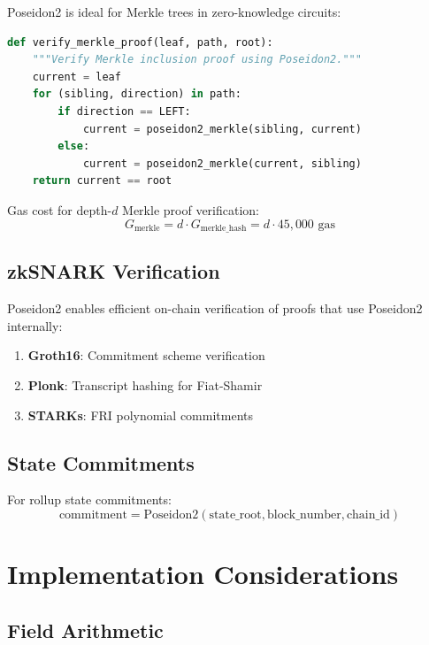 \documentclass[11pt,a4paper]{article}
\begin{document}
Poseidon2 is ideal for Merkle trees in zero-knowledge circuits:

\begin{lstlisting}[language=Python, caption={Merkle tree verification pattern}]
def verify_merkle_proof(leaf, path, root):
    """Verify Merkle inclusion proof using Poseidon2."""
    current = leaf
    for (sibling, direction) in path:
        if direction == LEFT:
            current = poseidon2_merkle(sibling, current)
        else:
            current = poseidon2_merkle(current, sibling)
    return current == root
\end{lstlisting}

Gas cost for depth-$d$ Merkle proof verification:
\begin{equation}
G_{\text{merkle}} = d \cdot G_{\text{merkle\_hash}} = d \cdot 45,000 \text{ gas}
\end{equation}

\subsection{zkSNARK Verification}

Poseidon2 enables efficient on-chain verification of proofs that use Poseidon2 internally:

\begin{enumerate}
    \item \textbf{Groth16}: Commitment scheme verification
    \item \textbf{Plonk}: Transcript hashing for Fiat-Shamir
    \item \textbf{STARKs}: FRI polynomial commitments
\end{enumerate}

\subsection{State Commitments}

For rollup state commitments:
\begin{equation}
\text{commitment} = \text{Poseidon2}(\text{state\_root}, \text{block\_number}, \text{chain\_id})
\end{equation}

\section{Implementation Considerations}

\subsection{Field Arithmetic}
\end{document}
